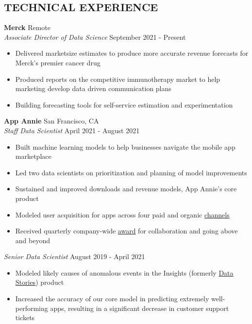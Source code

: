 \documentclass[line,margin,10pt]{res}
\begin{document}
\begin{resume}
\section{TECHNICAL EXPERIENCE}
\textbf{Merck} \hfill Remote\\
{\sl Associate Director of Data Science} \hfill September 2021 - Present
\begin{itemize} \itemsep -2pt
	\item Delivered marketsize estimates to produce more accurate revenue forecasts for Merck's premier cancer drug
	\item Produced reports on the competitive immunotherapy market to help marketing develop data driven communication plans
	\item Building forecasting tools for self-service estimation and experimentation
\end{itemize}
{\vspace{-0.25cm}}
\textbf{App Annie} \hfill San Francisco, CA\\
{\sl Staff  Data Scientist} \hfill April 2021 - August 2021
\begin{itemize} \itemsep -2pt
\item Built machine learning models to help businesses navigate the mobile app marketplace
\item Led two data scientists on prioritization and planning of model improvements
\item Sustained and improved downloads and revenue models, App Annie's core product
\item Modeled user acquisition for apps across four paid and organic \href{https://www.appannie.com/en/insights/product-announcements/understand-paid-vs-organic-downloads-with-improved-download-channel-report/}{channels}
\item Received quarterly company-wide \href{https://www.linkedin.com/pulse/meet-abbie-popa-staff-data-scientist-from-our-amer-region-thomas/?trackingId=BPJh%2B6dFR%2Baz%2BUpkpGznRA%3D%3D}{award} for collaboration and going above and beyond
\end{itemize}
{\vspace{-0.25cm}}
{\sl Senior Data Scientist} \hfill August 2019 - April 2021
\begin{itemize} \itemsep -2pt
\item Modeled likely causes of anomalous events in the Insights (formerly \href{https://www.appannie.com/en/insights/product-announcements/data-stories-labs/}{Data Stories}) product
\item Increased the accuracy of our core model in predicting extremely well-performing apps, resulting in a significant decrease in customer support tickets

\end{itemize}
\end{resume}
\end{document}
